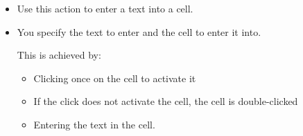 
\begin{itemize}
\item Use this action to enter a text into a cell.
\item You specify the text to enter and the cell to enter it into. 

This is achieved by:
\begin{itemize}
\item Clicking once on the cell to activate it
\item If the click does not activate the cell, the cell is double-clicked
\item Entering the text in the cell.
\end{itemize}
\end{itemize}

